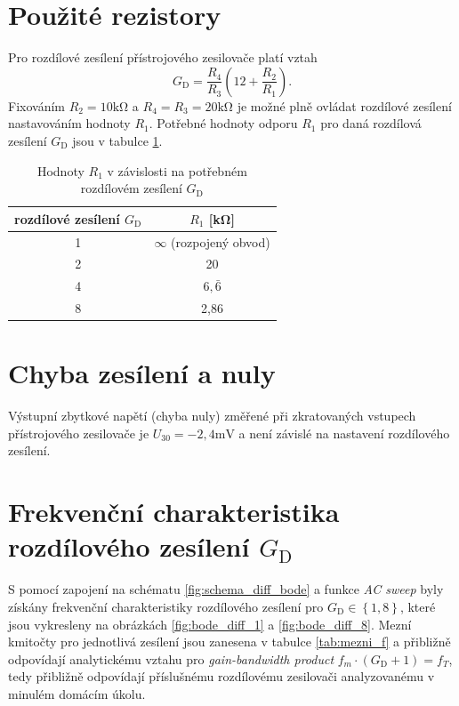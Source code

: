 \documentclass[twoside]{article}
\begin{document}
\section{Použité rezistory}

Pro rozdílové zesílení přístrojového zesilovače platí vztah
\begin{equation}
    G_\text{D} = \frac{R_4}{R_3}\left(1 2 +\frac{R_2}{R_1}\right).
\end{equation}
Fixováním $R_2 = 10 \si{\kilo\ohm}$ a $R_4 = R_3 = 20 \si{\kilo\ohm}$
je možné plně ovládat rozdílové zesílení nastavováním hodnoty $R_1$.
Potřebné hodnoty odporu $R_1$ pro daná rozdílová zesílení $G_\text{D}$ jsou v tabulce \ref{tab:R}.

\begin{table}
    \centering
    \begin{tabular}{c|c}
        rozdílové zesílení $G_\text{D}$ & $R_1$ [\si{\kilo\ohm}] \\
        \hline
        1 & $\infty$ (rozpojený obvod)\\
        2 & 20\\
        4 & $6,\bar{6}$ \\
        8 & 2,86
    \end{tabular}
    \caption{Hodnoty $R_1$ v závislosti na potřebném rozdílovém zesílení $G_\text{D}$}
    \label{tab:R}
\end{table}

\section{Chyba zesílení a nuly}

Výstupní zbytkové napětí (chyba nuly) změřené při zkratovaných vstupech přístrojového zesilovače je $U_{30} = -2,4 \si{\milli\volt}$
a není závislé na nastavení rozdílového zesílení.

\section{Frekvenční charakteristika rozdílového zesílení $G_\text{D}$}

S pomocí zapojení na schématu \ref{fig:schema_diff_bode} a funkce \textit{AC sweep} byly
získány frekvenční charakteristiky rozdílového zesílení pro $G_\text{D} \in \left\{1, 8\right\}$,
které jsou vykresleny na obrázkách \ref{fig:bode_diff_1} a \ref{fig:bode_diff_8}.
Mezní kmitočty pro jednotlivá zesílení jsou zanesena v tabulce \ref{tab:mezni_f}
a přibližně odpovídají analytickému vztahu pro \textit{gain-bandwidth product} $f_m \cdot (G_\text{D} + 1) = f_T$,
tedy přibližně odpovídají příslušnému rozdílovému zesilovači analyzovanému v minulém domácím úkolu.
\end{document}
